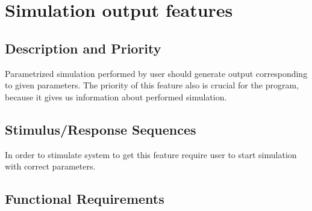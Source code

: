 \documentclass{report}
\begin{document}

\section{Simulation output features}

\subsection{Description and Priority}
Parametrized simulation performed by user should generate output corresponding to given parameters. The priority of this feature also is crucial for the program, because it gives us information about performed simulation.
\subsection{Stimulus/Response Sequences}
In order to stimulate system to get this feature require user to start simulation with correct parameters.
\subsection{Functional Requirements}
\end{document}

